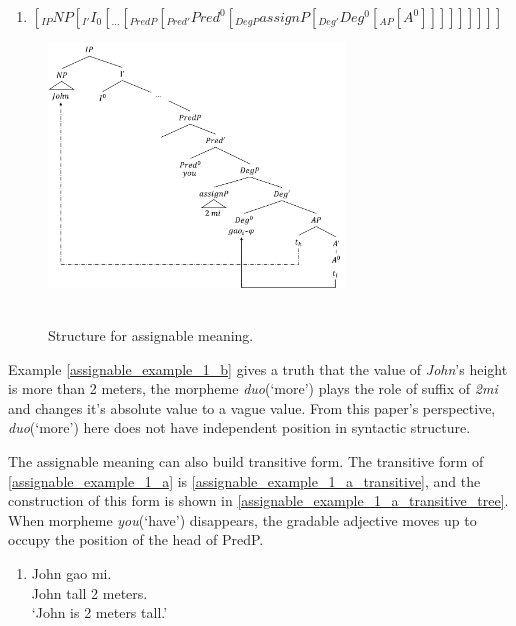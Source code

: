 \documentclass{ctexart}
\begin{document}
\begin{enumerate}
    \item \label{assignable_structure}
    $[_{IP} NP [_{I'} I_0[_{...}[_{PredP}[_{Pred'}Pred^0[_{DegP}assignP[_{Deg'}Deg^0[_{AP}[A^0]]]]]]]]]$
\end{enumerate}

\begin{figure}[H]
    \centering
    \includegraphics[width=0.7\textwidth]{pic/assignment_meaning.png}
    \begin{caption}
        \\ \vspace{-1.1ex}
        Structure for assignable meaning.
    \end{caption}
\end{figure}

Example \ref{assignable_example_1_b} gives a truth that the value of \textit{John}'s height is more than 2 meters, the morpheme \textit{duo}(`more') plays the role of suffix of \textit{2mi} and changes it's absolute value to a vague value. From this paper's perspective, \textit{duo}(`more') here does not have independent position in syntactic structure.

The assignable meaning can also build transitive form. The transitive form of \ref{assignable_example_1_a} is \ref{assignable_example_1_a_transitive}, and the construction of this form is shown in \ref{assignable_example_1_a_transitive_tree}. When morpheme \textit{you}(`have') disappears, the gradable adjective moves up to occupy the position of the head of PredP.

\begin{enumerate}
    \item \label{assignable_example_1_a_transitive}
    John gao  mi. \\
    John tall 2 meters. \\
    `John is 2 meters tall.'
\end{enumerate}
\end{document}
